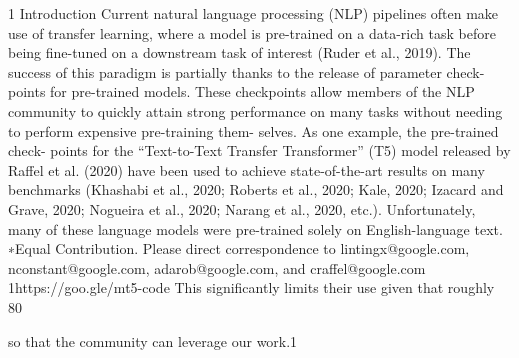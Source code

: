 1 Introduction Current natural language processing (NLP) pipelines often make use of transfer learning, where a model is pre-trained on a data-rich task before being ﬁne-tuned on a downstream task of interest (Ruder et al., 2019). The success of this paradigm is partially thanks to the release of parameter check- points for pre-trained models. These checkpoints allow members of the NLP community to quickly attain strong performance on many tasks without needing to perform expensive pre-training them- selves. As one example, the pre-trained check- points for the “Text-to-Text Transfer Transformer” (T5) model released by Raffel et al. (2020) have been used to achieve state-of-the-art results on many benchmarks (Khashabi et al., 2020; Roberts et al., 2020; Kale, 2020; Izacard and Grave, 2020; Nogueira et al., 2020; Narang et al., 2020, etc.). Unfortunately, many of these language models were pre-trained solely on English-language text. ∗Equal Contribution. Please direct correspondence to lintingx@google.com, nconstant@google.com, adarob@google.com, and craffel@google.com 1https://goo.gle/mt5-code This signiﬁcantly limits their use given that roughly 80%

so that the community can leverage our work.1

\vspace{18pt}

